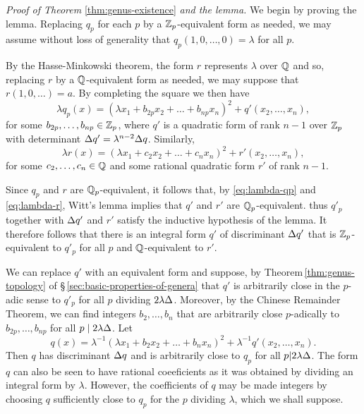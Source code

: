 \emph{Proof of Theorem} \ref{thm:genus-existence} \emph{and the lemma.} We begin by proving the lemma. Replacing \(q_p\) for each \(p\) by a \(\mathbb{Z}_p\)-equivalent form as needed, we may assume without loss of generality that \(q_p(1, 0, \dots, 0) = \lambda\) for all \(p\).

By the Hasse-Minkowski theorem, the form \(r\) represents \(\lambda\) over \(\mathbb{Q}\) and so, replacing \(r\) by a \(\mathbb{Q}\)-equivalent form as needed, we may suppose that \(r(1 ,0, \dots) = a\). By completing the square we then have
\begin{equation}\label{eq:lambda-qp}
    \lambda q_p(x) = (\lambda x_1 + b_{2p}x_2 + \dots + b_{np}x_n)^2 + q'(x_2, \dots, x_n),  
\end{equation}
for some \(b_{2p}, \dots, b_{np} \in \mathbb{Z}_p\), where \(q'\) is a quadratic form of rank \(n-1\) over \(\mathbb{Z}_p\) with determinant \({\Delta} q' = \lambda^{n-2} {\Delta} q\). Similarly,
\begin{equation}\label{eq:lambda-r}
    \lambda r(x) = (\lambda x_1 + c_2x_2 + \dots + c_nx_n)^2 + r'(x_2, \dots, x_n),
\end{equation}
for some \(c_2, \dots, c_n \in \mathbb{Q}\) and some rational quadratic form \(r'\) of rank \(n-1\).

Since \(q_p\) and \(r\) are \(\mathbb{Q}_p\)-equivalent, it follows that, by \eqref{eq:lambda-qp} and \eqref{eq:lambda-r}, Witt's lemma implies that \(q'\) and \(r'\) are \(\mathbb{Q}_p\)-equivalent. thus \(q'_p\) together with \({\Delta} q'\) and \(r'\) satisfy the inductive hypothesis of the lemma. It therefore follows that there is an integral form \(q'\) of discriminant \({\Delta} q'\) that is \(\mathbb{Z}_p\)-equivalent to \(q'_p\) for all \(p\) and \(\mathbb{Q}\)-equivalent to \(r'\).

We can replace \(q'\) with an equivalent form and suppose, by Theorem\,\ref{thm:genus-topology} of \S\,\ref{sec:basic-properties-of-genera} that \(q'\) is arbitrarily close in the \(p\)-adic sense to \(q'_p\) for all \(p\) dividing \(2 \lambda{\Delta}\). Moreover, by the Chinese Remainder Theorem, we can find integers  \(b_2, \dots, b_n\) that are arbitrarily close \(p\)-adically to \(b_{2p}, \dots, b_{np}\) for all \(p \mid 2 \lambda {\Delta}\). Let
\begin{equation}\label{eq:q-definition-lemma}
    q(x) = \lambda^{-1}(\lambda x_1 + b_2x_2 + \dots + b_nx_n)^2 + \lambda^{-1}q'(x_2, \dots, x_n).
\end{equation}
Then \(q\) has discriminant \({\Delta} q\) and is arbitrarily close to \(q_p\) for all \(p | 2\lambda{\Delta}\). The form \(q\) can also be seen to have rational coeeficients as it was obtained by dividing an integral form by \(\lambda\). However, the coefficients of \(q\) may be made integers by choosing \(q\) sufficiently close to \(q_p\) for the \(p\) dividing \(\lambda\), which we shall suppose.

